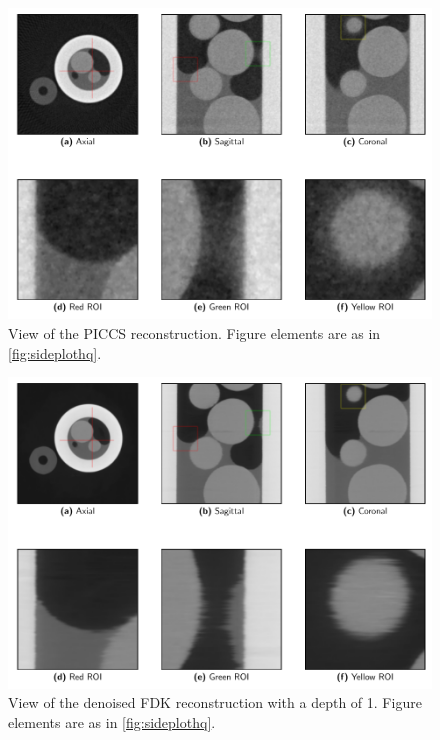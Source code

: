 \begin{figure}[htbp]
  \centering
  \includegraphics[width=.85\textwidth]{figures/kimrobertpiccs-x475y620s250.pdf}
  \caption[PICCS]{View of the PICCS reconstruction. Figure elements are as in \cref{fig:sideplothq}. }
  \label{fig:sideplotpiccs}
\end{figure}

\begin{figure}[htbp]
  \centering
  \includegraphics[width=.85\textwidth]{figures/kimrobertdepth1-x475y620s250.pdf}
  \caption[Depth=1]{View of the denoised FDK reconstruction with a depth of 1. Figure elements are as in \cref{fig:sideplothq}. }
  \label{fig:sideplotdepth1}
\end{figure}

